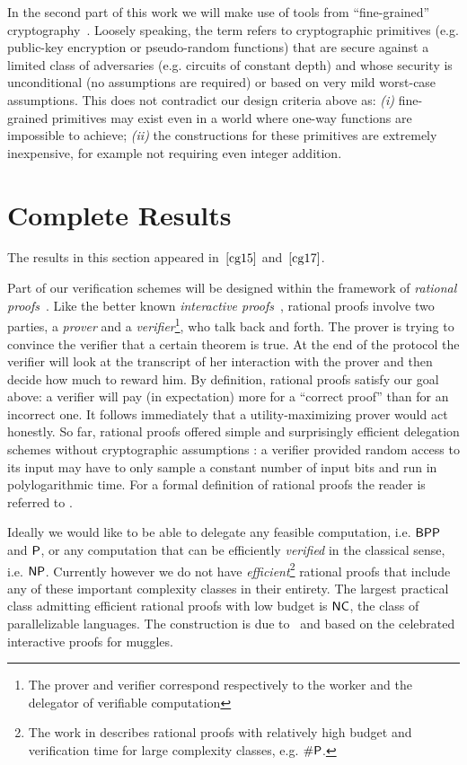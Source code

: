 In the second part of this work we will make use of tools from ``fine-grained'' cryptography~\cite{fgcrypto}. Loosely speaking, the term refers to cryptographic primitives (e.g. public-key encryption or pseudo-random functions) that are secure against a limited class of adversaries (e.g. circuits of constant depth) and whose security is unconditional (no assumptions are required) or based on very mild worst-case assumptions. This does not contradict our design criteria above as: \textit{(i)} fine-grained primitives may exist even in a world  where one-way functions are impossible to achieve; \textit{(ii)} the constructions for these primitives are extremely inexpensive, for example not requiring even integer addition.

\section{Complete Results}

The results in this section appeared in~$\cite{cg15}$ and~$\cite{cg17}$.

Part of our verification schemes will be designed within the framework of \textit{rational proofs}~\cite{am}. Like the better known \textit{interactive proofs}~\cite{gmr}, rational proofs involve two parties, a \textit{prover} and a \textit{verifier}\footnote{The prover and verifier correspond respectively to the worker and the delegator of verifiable computation}, who talk back and forth. The prover is trying to convince the verifier that a certain theorem is true. At the end of the protocol the verifier will look at the transcript of her interaction with the prover and then decide how much to reward him.
By definition, rational proofs satisfy our goal above: a verifier will pay (in expectation) more for a ``correct proof'' than for an incorrect one. It follows immediately that a utility-maximizing prover would act honestly.
So far, rational proofs offered simple and surprisingly efficient delegation schemes without cryptographic assumptions \cite{am1,ratargs,ratsumchecks}: a verifier provided random access to its input may have to only sample a constant number of input bits and run in polylogarithmic time. For  a formal definition of rational proofs the reader is referred to \cite{cg15}.

Ideally we would like to be able to delegate any feasible computation, i.e. $\BPP$ and $\P$, or any computation that can be efficiently  \textit{verified} in the classical sense, i.e. $\NP$. Currently however we do not have \textit{efficient}\footnote{The work in \cite{am} describes rational proofs with relatively high budget and verification time for large complexity classes, e.g. $\#\P$.} rational proofs that include any of these important complexity classes in their entirety. The largest practical class admitting efficient rational proofs with low budget is $\NC$, the class of parallelizable languages. The construction is due to~\cite{ratsumchecks} and based on the celebrated interactive proofs for muggles\cite{muggles}.

